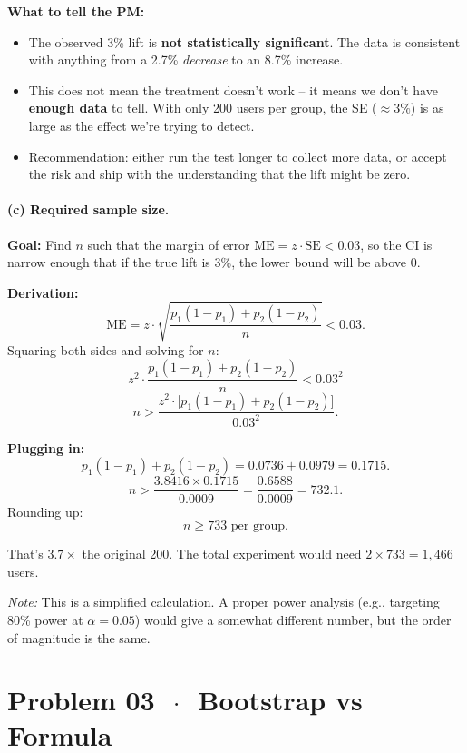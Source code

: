 \documentclass[11pt]{article}
\begin{document}
\textbf{What to tell the PM:}
\begin{itemize}
  \item The observed 3\% lift is \textbf{not statistically significant}. The data is consistent with anything from a 2.7\% \textit{decrease} to an 8.7\% increase.
  \item This does not mean the treatment doesn't work -- it means we don't have \textbf{enough data} to tell. With only 200 users per group, the SE ($\approx 3\%$) is as large as the effect we're trying to detect.
  \item Recommendation: either run the test longer to collect more data, or accept the risk and ship with the understanding that the lift might be zero.
\end{itemize}

\paragraph{(c) Required sample size.}

\textbf{Goal:} Find $n$ such that the margin of error $\text{ME} = z \cdot \text{SE} < 0.03$, so the CI is narrow enough that if the true lift is 3\%, the lower bound will be above 0.

\textbf{Derivation:}
\[
  \text{ME} = z \cdot \sqrt{\frac{p_1(1-p_1) + p_2(1-p_2)}{n}} < 0.03.
\]
Squaring both sides and solving for $n$:
\[
  z^2 \cdot \frac{p_1(1-p_1) + p_2(1-p_2)}{n} < 0.03^2
\]
\[
  n > \frac{z^2 \cdot \bigl[p_1(1-p_1) + p_2(1-p_2)\bigr]}{0.03^2}.
\]

\textbf{Plugging in:}
\[
  p_1(1-p_1) + p_2(1-p_2) = 0.0736 + 0.0979 = 0.1715.
\]
\[
  n > \frac{3.8416 \times 0.1715}{0.0009} = \frac{0.6588}{0.0009} = 732.1.
\]
Rounding up:
\[
  \boxed{n \geq 733 \text{ per group}}.
\]

That's $3.7\times$ the original 200. The total experiment would need $2 \times 733 = 1{,}466$ users.

\textit{Note:} This is a simplified calculation. A proper power analysis (e.g., targeting 80\% power at $\alpha = 0.05$) would give a somewhat different number, but the order of magnitude is the same.

\section*{Problem 03 \texorpdfstring{$\,\cdot\,$}{-} Bootstrap vs Formula}
\end{document}
